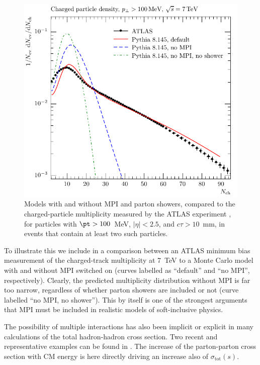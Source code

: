 \begin{figure}[t]
\center
\includegraphics*[scale=0.75]{mc-plots/ATLAS_2010_CONF_2010_046-inline/ATLAS_2010_CONF_2010_046_d03-x02-y01}
\caption{Models with and without MPI and parton showers, compared to
the charged-particle multiplicity measured by the ATLAS
experiment \cite{Atlas:2010xx}, 
for particles with $\pt>100$~MeV, $|\eta|<2.5$, and $c\tau > 10$~mm,
in events that contain at least two such particles. \label{fig:mbnch}}
\end{figure}
To illustrate this we include in  a comparison
between an ATLAS minimum bias measurement of the charged-track
multiplicity at 7~TeV to a Monte Carlo model with and without MPI
switched on (curves labelled as ``default'' and ``no MPI'',
respectively). Clearly, the predicted multiplicity distribution
without MPI is far too narrow, regardless of whether parton showers
are included or not (curve labelled ``no MPI, no shower''). This by
itself is one of the strongest arguments that MPI must be included in
realistic models of soft-inclusive physics.

The possibility of multiple interactions has also been implicit
or explicit in many calculations of the total hadron-hadron cross
section.  Two recent and representative examples can be found in  
 \cite{Avsar:2008dn,Grau:2009qx}.  
The increase of the parton-parton cross section with CM energy is here
directly driving an increase also of $\sigma_{\mathrm{tot}}(s)$.   

